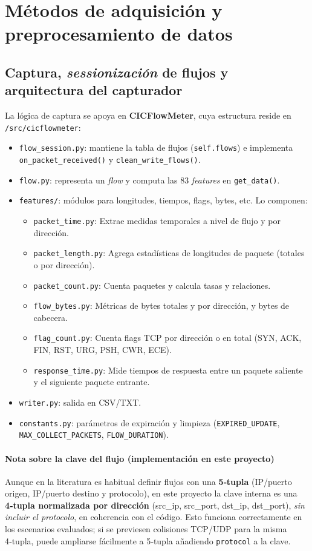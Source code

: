\section{Métodos de adquisición y preprocesamiento de datos}

\subsection*{Captura, \textit{sessionización} de flujos y arquitectura del capturador}
La lógica de captura se apoya en \textbf{CICFlowMeter}, cuya estructura reside en \texttt{/src/cicflowmeter}:
\begin{itemize}
  \item \texttt{flow\_session.py}: mantiene la tabla de flujos (\texttt{self.flows}) e implementa \texttt{on\_packet\_received()} y \texttt{clean\_write\_flows()}.
  \item \texttt{flow.py}: representa un \emph{flow} y computa las 83 \textit{features} en \texttt{get\_data()}.
  \item \texttt{features/}: módulos para longitudes, tiempos, flags, bytes, etc. Lo componen:
  \begin{itemize}
    \item \texttt{packet\_time.py}: Extrae medidas temporales a nivel de flujo y por dirección.
    \item \texttt{packet\_length.py}: Agrega estadísticas de longitudes de paquete (totales o por dirección).
    \item \texttt{packet\_count.py}: Cuenta paquetes y calcula tasas y relaciones.
    \item \texttt{flow\_bytes.py}: Métricas de bytes totales y por dirección, y bytes de cabecera.
    \item \texttt{flag\_count.py}: Cuenta flags TCP por dirección o en total (SYN, ACK, FIN, RST, URG, PSH, CWR, ECE).
    \item \texttt{response\_time.py}: Mide tiempos de respuesta entre un paquete saliente y el siguiente paquete entrante.
  \end{itemize}
  \item \texttt{writer.py}: salida en CSV/TXT.
  \item \texttt{constants.py}: parámetros de expiración y limpieza (\texttt{EXPIRED\_UPDATE}, \texttt{MAX\_COLLECT\_PACKETS}, \texttt{FLOW\_DURATION}).
\end{itemize}

\paragraph{Nota sobre la clave del flujo (implementación en este proyecto)}
Aunque en la literatura es habitual definir flujos con una \textbf{5‑tupla} (IP/puerto origen, IP/puerto destino y protocolo), en este proyecto la clave interna es una \textbf{4‑tupla normalizada por dirección} (src\_ip, src\_port, dst\_ip, dst\_port), \emph{sin incluir el protocolo}, en coherencia con el código. Esto funciona correctamente en los escenarios evaluados; si se previesen colisiones TCP/UDP para la misma 4‑tupla, puede ampliarse fácilmente a 5‑tupla añadiendo \texttt{protocol} a la clave.

